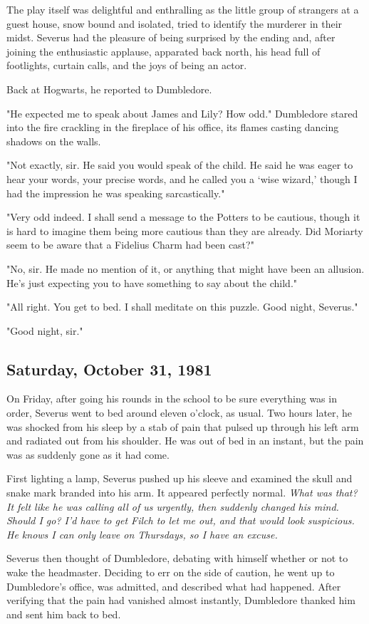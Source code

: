 The play itself was delightful and enthralling as the little group of strangers at a guest house, snow bound and isolated, tried to identify the murderer in their midst. Severus had the pleasure of being surprised by the ending and, after joining the enthusiastic applause, apparated back north, his head full of footlights, curtain calls, and the joys of being an actor.

Back at Hogwarts, he reported to Dumbledore.

"He expected me to speak about James and Lily? How odd." Dumbledore stared into the fire crackling in the fireplace of his office, its flames casting dancing shadows on the walls.

"Not exactly, sir. He said you would speak of the child. He said he was eager to hear your words, your precise words, and he called you a `wise wizard,' though I had the impression he was speaking sarcastically."

"Very odd indeed. I shall send a message to the Potters to be cautious, though it is hard to imagine them being more cautious than they are already. Did Moriarty seem to be aware that a Fidelius Charm had been cast?"

"No, sir. He made no mention of it, or anything that might have been an allusion. He's just expecting you to have something to say about the child."

"All right. You get to bed. I shall meditate on this puzzle. Good night, Severus."

"Good night, sir."

\subsection{Saturday, October 31, 1981}


On Friday, after going his rounds in the school to be sure everything was in order, Severus went to bed around eleven o'clock, as usual. Two hours later, he was shocked from his sleep by a stab of pain that pulsed up through his left arm and radiated out from his shoulder. He was out of bed in an instant, but the pain was as suddenly gone as it had come.

First lighting a lamp, Severus pushed up his sleeve and examined the skull and snake mark branded into his arm. It appeared perfectly normal. \emph{What was that? It felt like he was calling all of us urgently, then suddenly changed his mind. Should I go? I'd have to get Filch to let me out, and that would look suspicious. He knows I can only leave on Thursdays, so I have an excuse.}

Severus then thought of Dumbledore, debating with himself whether or not to wake the headmaster. Deciding to err on the side of caution, he went up to Dumbledore's office, was admitted, and described what had happened. After verifying that the pain had vanished almost instantly, Dumbledore thanked him and sent him back to bed.


